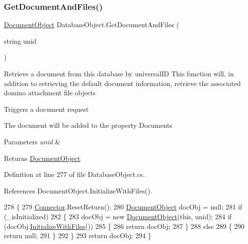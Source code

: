\subsubsection{\texorpdfstring{Get\+Document\+And\+Files()}{GetDocumentAndFiles()}}
{\footnotesize\ttfamily \mbox{\hyperlink{class_document_object}{Document\+Object}} Database\+Object.\+Get\+Document\+And\+Files (\begin{DoxyParamCaption}\item[{string}]{unid }\end{DoxyParamCaption})}



Retrieve a document from this database by universal\+ID This function will, in addition to retrieving the default document information, retrieve the associated domino attachment file objects 

Triggers a document request

The document will be added to the property \textquotesingle{}Documents\textquotesingle{}


\begin{DoxyParams}{Parameters}
{\em unid} & \\
\hline
\end{DoxyParams}
\begin{DoxyReturn}{Returns}
\mbox{\hyperlink{class_document_object}{Document\+Object}}
\end{DoxyReturn}


Definition at line 277 of file Database\+Object.\+cs.



References Document\+Object.\+Initialize\+With\+Files().


\begin{DoxyCode}
278     \{
279         \mbox{\hyperlink{class_connector}{Connector}}.ResetReturn();
280         \mbox{\hyperlink{class_document_object}{DocumentObject}} docObj = null;
281         \textcolor{keywordflow}{if} (\_isInitialized)
282         \{
283             docObj = \textcolor{keyword}{new} \mbox{\hyperlink{class_document_object}{DocumentObject}}(\textcolor{keyword}{this}, unid);
284             \textcolor{keywordflow}{if} (docObj.\mbox{\hyperlink{class_document_object_a83f0e855adc5fb7afd02d2e34767f5c8}{InitializeWithFiles}}())
285             \{
286                 \textcolor{keywordflow}{return} docObj;
287             \}
288             \textcolor{keywordflow}{else}
289             \{
290                 \textcolor{keywordflow}{return} null;
291             \}
292         \}
293         \textcolor{keywordflow}{return} docObj;
294     \}
\end{DoxyCode}
\mbox{\label{class_database_object_a1d35f51baee4be6adb69a954efe5b4bf}} 
